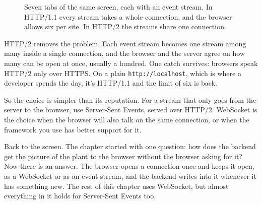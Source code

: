 \begin{figure}[htbp]
\centering
{}
\caption{Seven tabs of the same screen, each with an event stream. In HTTP/1.1
every stream takes a whole connection, and the browser allows six per site. In
HTTP/2 the streams share one connection.}
\end{figure}

HTTP/2 removes the problem. Each event stream becomes one stream among many
inside a single connection, and the browser and the server agree on how many
can be open at once, usually a hundred. One catch survives: browsers speak
HTTP/2 only over HTTPS. On a plain \texttt{http://localhost}, which is where a
developer spends the day, it's HTTP/1.1 and the limit of six is back.

So the choice is simpler than its reputation. For a stream that only goes from
the server to the browser, use Server-Sent Events, served over HTTP/2. WebSocket
is the choice when the browser will also talk on the same connection, or when
the framework you use has better support for it.

Back to the screen. The chapter started with one question: how does the
backend get the picture of the plant to the browser without the browser asking
for it? Now there is an answer. The browser opens a connection once and keeps it
open, as a WebSocket or as an event stream, and the backend writes into it
whenever it has something new. The rest of this chapter uses WebSocket, but
almost everything in it holds for Server-Sent Events too.


